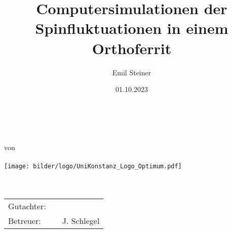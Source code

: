 

\usepackage{subfiles} %

\newcommand{\thesisTitle}{
\begin{sffamily}
\centering
\Huge\textbf{\docTitle}\\
\vspace{4em}
\huge\textbf{\docThesisType}\\
\centering von\\
\Large\textbf{\docAuthor}\\
\texttt{[image: bilder/logo/UniKonstanz\_Logo\_Optimum.pdf]}\\
\Large\docUnisection\\
\Large\docDepartment\\
\vspace{3em}
\centering\begin{tabular}{lll}%
Gutachter: & & \docSupervisorOne\\
Betreuer: & & J. Schlegel\\%
\end{tabular}\\
\end{sffamily}
}%


\date{01.10.2023}
\author{Emil Steiner}
\title{Computersimulationen der Spinfluktuationen in einem Orthoferrit}
\subtitle{}




\thesisTitle
\thispagestyle{empty}
\newpage

% 

\tableofcontents
\thispagestyle{empty}	%
\newpage
\setcounter{page}{1}	%

